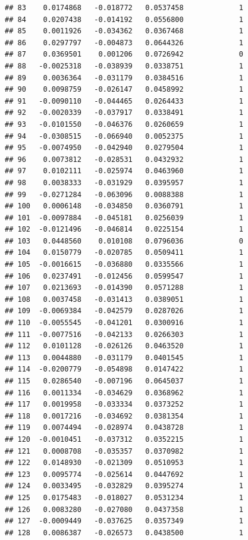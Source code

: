 \documentclass[12pt]{article}\usepackage[]{graphicx}\usepackage[]{xcolor}
\makeatletter
\newenvironment{kframe}{%
 \def\at@end@of@kframe{}%
 \ifinner\ifhmode%
  \def\at@end@of@kframe{\end{minipage}}%
  \begin{minipage}{\columnwidth}%
 \fi\fi%
 \def\FrameCommand##1{\hskip\@totalleftmargin \hskip-\fboxsep
 \colorbox{shadecolor}{##1}\hskip-\fboxsep
     \hskip-\linewidth \hskip-\@totalleftmargin \hskip\columnwidth}%
 \MakeFramed {\advance\hsize-\width
   \@totalleftmargin\z@ \linewidth\hsize
   \@setminipage}}%
 {\par\unskip\endMakeFramed%
 \at@end@of@kframe}
\newenvironment{knitrout}{}{} %
\makeatother
\begin{document}
\begin{knitrout}
\begin{kframe}
\begin{verbatim}
## 83    0.0174868   -0.018772   0.0537458             1
## 84    0.0207438   -0.014192   0.0556800             1
## 85    0.0011926   -0.034362   0.0367468             1
## 86    0.0297797   -0.004873   0.0644326             1
## 87    0.0369501    0.001206   0.0726942             0
## 88   -0.0025318   -0.038939   0.0338751             1
## 89    0.0036364   -0.031179   0.0384516             1
## 90    0.0098759   -0.026147   0.0458992             1
## 91   -0.0090110   -0.044465   0.0264433             1
## 92   -0.0020339   -0.037917   0.0338491             1
## 93   -0.0101550   -0.046376   0.0260659             1
## 94   -0.0308515   -0.066940   0.0052375             1
## 95   -0.0074950   -0.042940   0.0279504             1
## 96    0.0073812   -0.028531   0.0432932             1
## 97    0.0102111   -0.025974   0.0463960             1
## 98    0.0038333   -0.031929   0.0395957             1
## 99   -0.0271284   -0.063096   0.0088388             1
## 100   0.0006148   -0.034850   0.0360791             1
## 101  -0.0097884   -0.045181   0.0256039             1
## 102  -0.0121496   -0.046814   0.0225154             1
## 103   0.0448560    0.010108   0.0796036             0
## 104   0.0150779   -0.020785   0.0509411             1
## 105  -0.0016615   -0.036880   0.0335566             1
## 106   0.0237491   -0.012456   0.0599547             1
## 107   0.0213693   -0.014390   0.0571288             1
## 108   0.0037458   -0.031413   0.0389051             1
## 109  -0.0069384   -0.042579   0.0287026             1
## 110  -0.0055545   -0.041201   0.0300916             1
## 111  -0.0077516   -0.042133   0.0266303             1
## 112   0.0101128   -0.026126   0.0463520             1
## 113   0.0044880   -0.031179   0.0401545             1
## 114  -0.0200779   -0.054898   0.0147422             1
## 115   0.0286540   -0.007196   0.0645037             1
## 116   0.0011334   -0.034629   0.0368962             1
## 117   0.0019958   -0.033334   0.0373252             1
## 118   0.0017216   -0.034692   0.0381354             1
## 119   0.0074494   -0.028974   0.0438728             1
## 120  -0.0010451   -0.037312   0.0352215             1
## 121   0.0008708   -0.035357   0.0370982             1
## 122   0.0148930   -0.021309   0.0510953             1
## 123   0.0095774   -0.025614   0.0447692             1
## 124   0.0033495   -0.032829   0.0395274             1
## 125   0.0175483   -0.018027   0.0531234             1
## 126   0.0083280   -0.027080   0.0437358             1
## 127  -0.0009449   -0.037625   0.0357349             1
## 128   0.0086387   -0.026573   0.0438500             1

\end{verbatim}
\end{kframe}
\end{knitrout}
\end{document}
